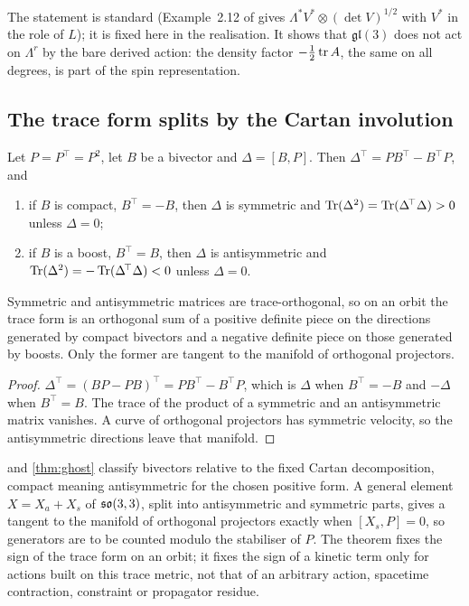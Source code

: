 The statement is standard (Example~2.12 of \cite{Gualtieri03} gives $\Lambda^*V^*\otimes(\det V)^{1/2}$ with $V^*$ in the role of $L$); it is fixed
here in the realisation. It shows that $\mathfrak{gl}(3)$ does not act on $\Lambda^r$ by the bare derived action: the density factor
$-\tfrac12\operatorname{tr} A$, the same on all degrees, is part of the spin representation.

\subsection{The trace form splits by the Cartan involution}
\label{sec:cartansplit}

\begin{theorem}
\label{thm:ghost}
Let $P=P^{\!\top}=P^2$, let $B$ be a bivector and $\Delta=[B,P]$. Then $\Delta^{\!\top}=PB^{\!\top}-B^{\!\top}P$, and
\begin{enumerate}[label=(\roman*),leftmargin=2.2em]
\item if $B$ is compact, $B^{\!\top}=-B$, then $\Delta$ is symmetric and $\operatorname{Tr}(\Delta^2)=\operatorname{Tr}(\Delta^{\!\top}\Delta)>0$ unless $\Delta=0$;
\item if $B$ is a boost, $B^{\!\top}=B$, then $\Delta$ is antisymmetric and $\operatorname{Tr}(\Delta^2)=-\operatorname{Tr}(\Delta^{\!\top}\Delta)<0$ unless $\Delta=0$.
\end{enumerate}
Symmetric and antisymmetric matrices are trace-orthogonal, so on an orbit the trace form is an orthogonal sum of a positive
definite piece on the directions generated by compact bivectors and a negative definite piece on those generated by boosts. Only
the former are tangent to the manifold of orthogonal projectors.
\end{theorem}

\begin{proof}
$\Delta^{\!\top}=(BP-PB)^{\!\top}=PB^{\!\top}-B^{\!\top}P$, which is $\Delta$ when $B^{\!\top}=-B$ and $-\Delta$ when $B^{\!\top}=B$. The trace of the
product of a symmetric and an antisymmetric matrix vanishes. A curve of orthogonal projectors has symmetric velocity, so the
antisymmetric directions leave that manifold.
\end{proof}

 and \cref{thm:ghost} classify bivectors relative to the fixed Cartan decomposition, compact meaning antisymmetric for the
chosen positive form. A general element $X=X_a+X_s$ of $\mathfrak{so}(3,3)$, split into antisymmetric and symmetric parts, gives a tangent to the
manifold of orthogonal projectors exactly when $[X_s,P]=0$, so generators are to be counted modulo the stabiliser of $P$. The theorem fixes the
sign of the trace form on an orbit; it fixes the sign of a kinetic term only for actions built on this trace metric, not that of an arbitrary
action, spacetime contraction, constraint or propagator residue.

